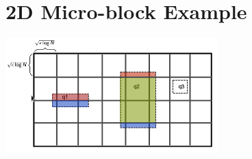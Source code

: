 \section{2D Micro-block Example}
\begin{center}
\includegraphics[height=4.5cm,]{img/2dmicro.png}
\end{center}

